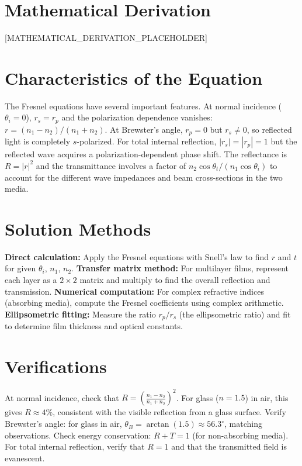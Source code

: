 \documentclass[11pt,openright]{book}
\begin{document}
\section*{Mathematical Derivation}

[MATHEMATICAL_DERIVATION_PLACEHOLDER]

\section*{Characteristics of the Equation}

The Fresnel equations have several important features. At normal incidence ($\theta_i = 0$), $r_s = r_p$ and the polarization dependence vanishes: $r = (n_1 - n_2)/(n_1 + n_2)$. At Brewster's angle, $r_p = 0$ but $r_s \neq 0$, so reflected light is completely $s$-polarized. For total internal reflection, $|r_s| = |r_p| = 1$ but the reflected wave acquires a polarization-dependent phase shift. The reflectance is $R = |r|^2$ and the transmittance involves a factor of $n_2\cos\theta_t/(n_1\cos\theta_i)$ to account for the different wave impedances and beam cross-sections in the two media.
\section*{Solution Methods}

\textbf{Direct calculation:} Apply the Fresnel equations with Snell's law to find $r$ and $t$ for given $\theta_i$, $n_1$, $n_2$. \textbf{Transfer matrix method:} For multilayer films, represent each layer as a $2\times 2$ matrix and multiply to find the overall reflection and transmission. \textbf{Numerical computation:} For complex refractive indices (absorbing media), compute the Fresnel coefficients using complex arithmetic. \textbf{Ellipsometric fitting:} Measure the ratio $r_p/r_s$ (the ellipsometric ratio) and fit to determine film thickness and optical constants.
\section*{Verifications}

At normal incidence, check that $R = \left(\frac{n_1 - n_2}{n_1 + n_2}\right)^2$. For glass ($n = 1.5$) in air, this gives $R \approx 4\%$, consistent with the visible reflection from a glass surface. Verify Brewster's angle: for glass in air, $\theta_B = \arctan(1.5) \approx 56.3^\circ$, matching observations. Check energy conservation: $R + T = 1$ (for non-absorbing media). For total internal reflection, verify that $R = 1$ and that the transmitted field is evanescent.
\end{document}
